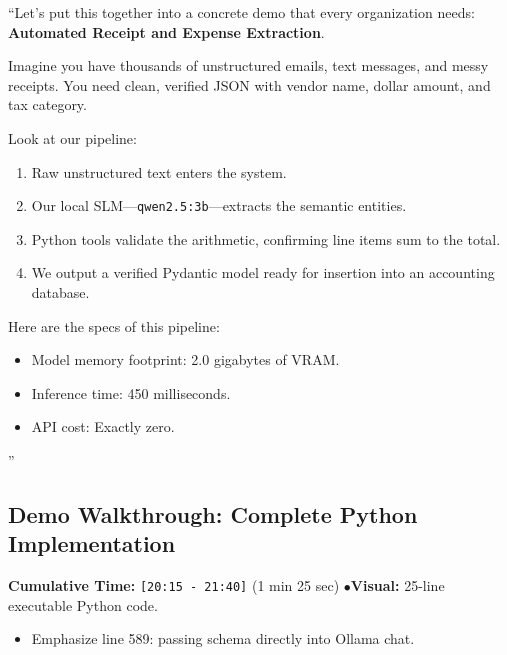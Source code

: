 \documentclass[11pt,a4paper]{article}
\begin{document}
\begin{speechbox}
``Let's put this together into a concrete demo that every organization needs: \textbf{Automated Receipt and Expense Extraction}.

Imagine you have thousands of unstructured emails, text messages, and messy receipts. You need clean, verified JSON with vendor name, dollar amount, and tax category.

Look at our pipeline:
\begin{enumerate}
    \item Raw unstructured text enters the system.
    \item Our local SLM---\texttt{qwen2.5:3b}---extracts the semantic entities.
    \item Python tools validate the arithmetic, confirming line items sum to the total.
    \item We output a verified Pydantic model ready for insertion into an accounting database.
\end{enumerate}

Here are the specs of this pipeline:
\begin{itemize}
    \item Model memory footprint: 2.0 gigabytes of VRAM.
    \item Inference time: 450 milliseconds.
    \item API cost: Exactly zero.
\end{itemize}''
\end{speechbox}

\subsection{Demo Walkthrough: Complete Python Implementation}
\begin{directionbox}
    \textbf{Cumulative Time:} \texttt{[20:15 - 21:40]} (1 min 25 sec) \quad$\bullet$\quad \textbf{Visual:} 25-line executable Python code.
    \begin{itemize}
        \item Emphasize line 589: passing schema directly into Ollama chat.
    \end{itemize}
\end{directionbox}
\end{document}

